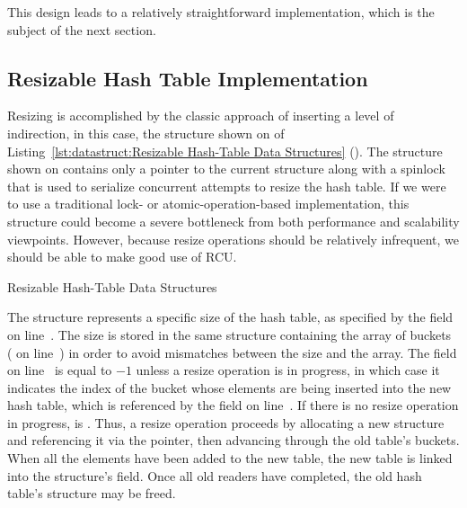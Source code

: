 This design leads to a relatively straightforward implementation,
which is the subject of the next section.

\subsection{Resizable Hash Table Implementation}
\label{sec:datastruct:Resizable Hash Table Implementation}

\begin{fcvref}
Resizing is accomplished by the classic approach of inserting a level
of indirection, in this case, the  structure shown on
 of
Listing~\ref{lst:datastruct:Resizable Hash-Table Data Structures}
().
The  structure shown on
 contains only a
pointer to the current  structure along with a spinlock that
is used to serialize concurrent attempts to resize the hash table.
If we were to use a traditional lock- or atomic-operation-based
implementation, this  structure could become a severe bottleneck
from both performance and scalability viewpoints.
However, because resize operations should be relatively infrequent,
we should be able to make good use of RCU.

\begin{listing}[tb]

\caption{Resizable Hash-Table Data Structures}
\label{lst:datastruct:Resizable Hash-Table Data Structures}
\end{listing}

The  structure represents a specific size of the hash table,
as specified by the  field on line~.
The size is stored in the same structure containing the array of
buckets ( on
line~) in order to avoid mismatches between
the size and the array.
The  field on
line~ is equal to $-1$ unless a resize
operation
is in progress, in which case it indicates the index of the bucket whose
elements are being inserted into the new hash table, which is referenced
by the  field on line~.
If there is no resize operation in progress,  is .
Thus, a resize operation proceeds by allocating a new  structure
and referencing it via the  pointer, then advancing
 through the old table's buckets.
When all the elements have been added to the new table, the new
table is linked into the  structure's  field.
Once all old readers have completed, the old hash table's  structure
may be freed.


\end{fcvref}
